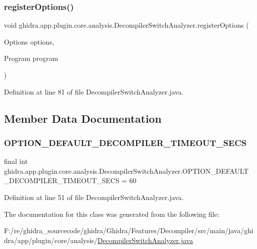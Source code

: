\subsubsection{\texorpdfstring{registerOptions()}{registerOptions()}}
{\footnotesize\ttfamily void ghidra.\+app.\+plugin.\+core.\+analysis.\+Decompiler\+Switch\+Analyzer.\+register\+Options (\begin{DoxyParamCaption}\item[{Options}]{options,  }\item[{Program}]{program }\end{DoxyParamCaption})\hspace{0.3cm}{\ttfamily [inline]}}



Definition at line 81 of file Decompiler\+Switch\+Analyzer.\+java.



\subsection{Member Data Documentation}
\mbox{\label{classghidra_1_1app_1_1plugin_1_1core_1_1analysis_1_1_decompiler_switch_analyzer_a4fa167385d2a5c08232af25ce1afde31}} 
\subsubsection{\texorpdfstring{OPTION\_DEFAULT\_DECOMPILER\_TIMEOUT\_SECS}{OPTION\_DEFAULT\_DECOMPILER\_TIMEOUT\_SECS}}
{\footnotesize\ttfamily final int ghidra.\+app.\+plugin.\+core.\+analysis.\+Decompiler\+Switch\+Analyzer.\+O\+P\+T\+I\+O\+N\+\_\+\+D\+E\+F\+A\+U\+L\+T\+\_\+\+D\+E\+C\+O\+M\+P\+I\+L\+E\+R\+\_\+\+T\+I\+M\+E\+O\+U\+T\+\_\+\+S\+E\+CS = 60\hspace{0.3cm}{\ttfamily [static]}}



Definition at line 51 of file Decompiler\+Switch\+Analyzer.\+java.



The documentation for this class was generated from the following file\+:\begin{DoxyCompactItemize}
\item 
F\+:/re/ghidra\+\_\+sourcecode/ghidra/\+Ghidra/\+Features/\+Decompiler/src/main/java/ghidra/app/plugin/core/analysis/\mbox{\hyperlink{_decompiler_switch_analyzer_8java}{Decompiler\+Switch\+Analyzer.\+java}}\end{DoxyCompactItemize}
